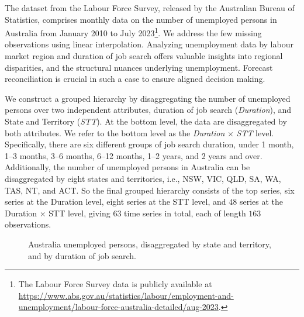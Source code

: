 \documentclass[
  11pt]{article}
\theoremstyle{plain}
\theoremstyle{remark}
\begin{document}
The dataset from the Labour Force Survey, released by the Australian
Bureau of Statistics, comprises monthly data on the number of unemployed
persons in Australia from January 2010 to July 2023\footnote{The Labour
  Force Survey data is publicly available at
  \url{https://www.abs.gov.au/statistics/labour/employment-and-unemployment/labour-force-australia-detailed/aug-2023}.}.
We address the few missing observations using linear interpolation.
Analyzing unemployment data by labour market region and duration of job
search offers valuable insights into regional disparities, and the
structural nuances underlying unemployment. Forecast reconciliation is
crucial in such a case to ensure aligned decision making.

We construct a grouped hierarchy by disaggregating the number of
unemployed persons over two independent attributes, duration of job
search (\emph{Duration}), and State and Territory (\emph{STT}). At the
bottom level, the data are disaggregated by both attributes. We refer to
the bottom level as the \emph{Duration} \(\times\) \emph{STT} level.
Specifically, there are six different groups of job search duration,
under 1 month, 1--3 months, 3--6 months, 6--12 months, 1--2 years, and 2
years and over. Additionally, the number of unemployed persons in
Australia can be disaggregated by eight states and territories, i.e.,
NSW, VIC, QLD, SA, WA, TAS, NT, and ACT. So the final grouped hierarchy
consists of the top series, six series at the Duration level, eight
series at the STT level, and \(48\) series at the Duration \(\times\)
STT level, giving \(63\) time series in total, each of length \(163\)
observations.

\begin{figure}[!t]


\caption{\label{fig-labour-data}Australia unemployed persons,
disaggregated by state and territory, and by duration of job search.}

\end{figure}%
\end{document}
